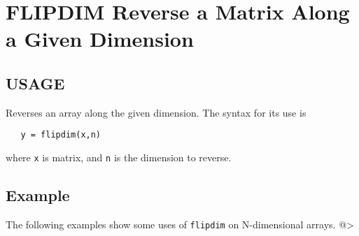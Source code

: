 \section{FLIPDIM Reverse a Matrix Along a Given Dimension}

\subsection{USAGE}

Reverses an array along the given dimension.  The syntax for its use is
\begin{verbatim}
   y = flipdim(x,n)
\end{verbatim}
where \verb|x| is matrix, and \verb|n| is the dimension to reverse.
\subsection{Example}

The following examples show some uses of \verb|flipdim| on N-dimensional
arrays.
@>
